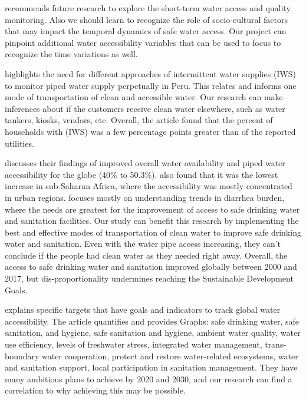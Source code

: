 \documentclass[10pt,twoside]{article}
\numberwithin{equation}{section}
\newcommand{\?}{\stackrel{?}{=}}
\begin{document}
\citet{price2019difference} recommends future research to explore the short-term water access and quality monitoring. Also we should learn to recognize the role of socio-cultural factors that may impact the temporal dynamics of safe water access. Our project can pinpoint additional water accessibility variables that can be used to focus to recognize the time variations as well.  

\citet{rawas2020comparing} highlights the need for different approaches of intermittent water supplies (IWS) to monitor piped water supply perpetually in Peru. This relates and informs one mode of transportation of clean and accessible water. Our research can make inferences about if the customers receive clean water elsewhere, such as water tankers, kiosks, vendors, etc. Overall, the article found that the percent of households with (IWS) was a few percentage points greater than of the reported utilities. 

\citet{deshpande2020mapping} discusses their findings of improved overall water availability and piped water accessibility for the globe (40\% to 50.3\%). \citet{deshpande2020mapping} also found that it was the lowest increase in sub-Saharan Africa, where the accessibility was mostly concentrated in urban regions. \citet{deshpande2020mapping} focuses mostly on understanding trends in diarrhea burden, where the needs are greatest for the improvement of access to safe drinking water and sanitation facilities. Our study can benefit this research by implementing the best and effective modes of transportation of clean water to improve safe drinking water and sanitation. Even with the water pipe access increasing, they can't conclude if the people had clean water as they needed right away. Overall, the access to safe drinking water and sanitation improved globally between 2000 and 2017, but dis-proportionality undermines reaching the Sustainable Development Goals. 

\citet{goal} explains specific targets that have goals and indicators to track global water accessibility. The article quantifies and provides Graphs: safe drinking water, safe sanitation, and hygiene, safe sanitation and hygiene, ambient water quality, water use efficiency, levels of freshwater stress, integrated water management, trans-boundary water cooperation, protect and restore water-related ecosystems, water and sanitation support, local participation in sanitation management. They have many ambitious plans to achieve by 2020 and 2030, and our research can find a correlation to why achieving this may be possible.
\end{document}
